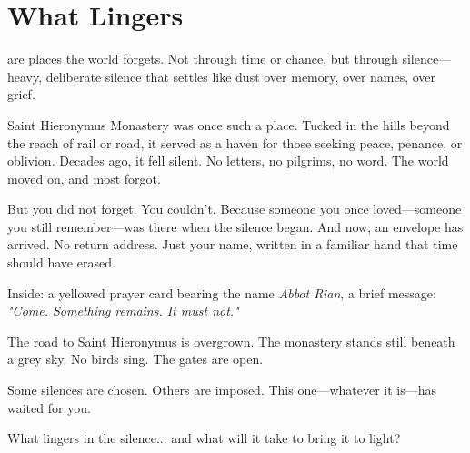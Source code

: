 \documentclass[nodeprecatedcode,bg=print]{dndbook/dndbook}
\begin{document}
\DndSetThemeColor[DmgSlateGray]
\twocolumn
\chapter*{What Lingers}
\begin{WyrdSettingHeading}
     are places the world forgets. Not through time or chance, but through silence—heavy, deliberate silence that settles like dust over memory, over names, over grief.

    \noindent
    Saint Hieronymus Monastery was once such a place. Tucked in the hills beyond the reach of rail or road, it served as a haven for those seeking peace, penance, or oblivion. Decades ago, it fell silent. No letters, no pilgrims, no word. The world moved on, and most forgot.

    But you did not forget. You couldn’t. Because someone you once loved—someone you still remember—was there when the silence began. And now, an envelope has arrived. No return address. Just your name, written in a familiar hand that time should have erased.

    Inside: a yellowed prayer card bearing the name \emph{Abbot Rian}, a brief message: \textit{"Come. Something remains. It must not."}

    The road to Saint Hieronymus is overgrown. The monastery stands still beneath a grey sky. No birds sing. The gates are open.

    Some silences are chosen. Others are imposed. This one—whatever it is—has waited for you.

    What lingers in the silence... and what will it take to bring it to light?
\end{WyrdSettingHeading}
\end{document}
